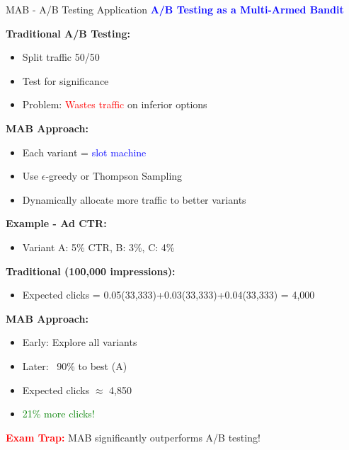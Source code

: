 \documentclass[8pt]{beamer}
\begin{document}
	\begin{frame}{MAB - A/B Testing Application}
		\fontsize{6.5}{7.5}\selectfont
		\textcolor{blue}{\textbf{A/B Testing as a Multi-Armed Bandit}}
		
		\textbf{Traditional A/B Testing:}
		\begin{itemize}
			\item Split traffic 50/50
			\item Test for significance
			\item Problem: \textcolor{red}{Wastes traffic} on inferior options
		\end{itemize}
		
		\textbf{MAB Approach:}
		\begin{itemize}
			\item Each variant = \textcolor{blue}{slot machine}
			\item Use $\epsilon$-greedy or Thompson Sampling
			\item Dynamically allocate more traffic to better variants
		\end{itemize}
		
		\textbf{Example - Ad CTR:}
		\begin{itemize}
			\item Variant A: 5\% CTR, B: 3\%, C: 4\%
		\end{itemize}
		
		\textbf{Traditional (100,000 impressions):}
		\begin{itemize}
			\item Expected clicks = 0.05(33,333)+0.03(33,333)+0.04(33,333) = 4,000
		\end{itemize}
		
		\textbf{MAB Approach:}
		\begin{itemize}
			\item Early: Explore all variants
			\item Later: ~90\% to best (A)
			\item Expected clicks $\approx$ 4,850
			\item \textcolor{green}{21\% more clicks!}
		\end{itemize}
		
		\textcolor{red}{\textbf{Exam Trap:}} MAB significantly outperforms A/B testing!
	\end{frame}
	
\end{document}
